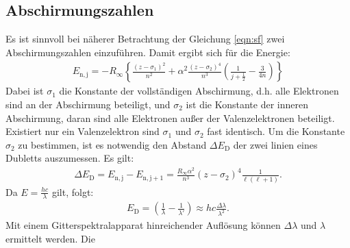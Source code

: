 \subsection{Abschirmungszahlen}
Es ist sinnvoll bei näherer Betrachtung der Gleichung \eqref{eqn:sf} zwei Abschirmungszahlen einzuführen.
Damit ergibt sich für die Energie:
\begin{align}
  E_\mathrm{n,j}=-R_\mathrm{\infty}\left\{\frac{(z-\sigma_\mathrm{1})^2}{n^2}+\alpha^2\frac{(z-\sigma_\mathrm{2})^4}{n^3}\left(\frac{1}{j+\frac{1}{2}}-\frac{3}{4n}\right)\right\}
\end{align}
Dabei ist $\sigma_\mathrm{1}$ die Konstante der vollständigen Abschirmung, d.h. alle Elektronen sind an der Abschirmung beteiligt,
und $\sigma_\mathrm{2}$ ist die Konstante der inneren Abschirmung, daran sind alle Elektronen außer der Valenzelektronen beteiligt.
Existiert nur ein Valenzelektron sind $\sigma_\mathrm{1}$ und $\sigma_\mathrm{2}$ fast identisch.
Um die Konstante $\sigma_\mathrm{2}$ zu bestimmen, ist es notwendig den Abstand $\Delta E_\mathrm{D}$ der zwei linien eines Dubletts auszumessen.
Es gilt:
\begin{align}
  \Delta E_\mathrm{D} = E_\mathrm{n,j}-E_\mathrm{n,j+1}=\frac{R_\mathrm{\infty}\alpha^2}{n^3}(z-\sigma_\mathrm{2})^4\frac{1}{\ell(\ell+1)}.
\end{align}
Da $E=\frac{hc}{\lambda}$ gilt, folgt:
\begin{align}
E_\mathrm{D}=\left(\frac{1}{\lambda}-\frac{1}{\lambda'}\right) \approx hc\frac{\Delta\lambda}{\lambda^2}.
\end{align}
Mit einem Gitterspektralapparat hinreichender Auflösung können $\Delta\lambda$ und $\lambda$ ermittelt werden.
Die
